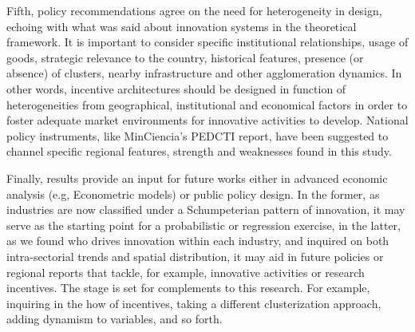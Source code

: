 \documentclass[12pt,a4paper]{article}
\begin{document}
Fifth, policy recommendations agree on the need for heterogeneity in design, echoing with what was said about innovation systems in the theoretical framework. It is important to consider specific institutional relationships, usage of goods, strategic relevance to the country, historical features, presence (or absence) of clusters, nearby infrastructure and other agglomeration dynamics. In other words, incentive architectures should be designed in function of heterogeneities from geographical, institutional and economical factors in order to foster adequate market environments for innovative activities to develop. National policy instruments, like MinCiencia's PEDCTI report, have been suggested to channel specific regional features, strength and weaknesses found in this study. 

Finally, results provide an input for future works either in advanced economic analysis (e.g, Econometric models) or public policy design. In the former, as industries are now classified under a Schumpeterian pattern of innovation, it may serve as the starting point for a probabilistic or regression exercise, in the latter, as we found who drives innovation within each industry, and inquired on both intra-sectorial trends and spatial distribution, it may aid in future policies or regional reports that tackle, for example, innovative activities or research incentives. The stage is set for complements to this research. For example, inquiring in the how of incentives, taking a different clusterization approach, adding dynamism to variables, and so forth. 


\pagebreak
\end{document}
